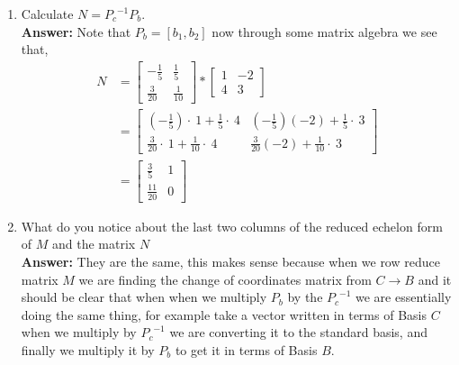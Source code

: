 \documentclass{amsart}
\begin{document}
\begin{enumerate}
\vspace{.1in}

\item Calculate $N = {P_c}^{-1}P_b$.\\
\noindent \textbf{Answer: } Note that $P_b = [b_1,b_2]$ now through some matrix algebra we see that,
\begin{align*}
N &= \begin{bmatrix}-\frac{1}{5}&\frac{1}{5}\\ \frac{3}{20}&\frac{1}{10}\end{bmatrix}
*\begin{bmatrix}
1&-2\\
4&3
\end{bmatrix}\\
&=
\begin{bmatrix}\left(-\frac{1}{5}\right)\cdot \:1+\frac{1}{5}\cdot \:4&\left(-\frac{1}{5}\right)\left(-2\right)+\frac{1}{5}\cdot \:3\\ \frac{3}{20}\cdot \:1+\frac{1}{10}\cdot \:4&\frac{3}{20}\left(-2\right)+\frac{1}{10}\cdot \:3\end{bmatrix}\\
&=
\begin{bmatrix}\frac{3}{5}&1\\ \frac{11}{20}&0\end{bmatrix}
\end{align*}
\vspace{.1in}

\item What do you notice about the last two columns of the reduced echelon form of $M$ and the matrix $N$\\
\noindent \textbf{Answer: }They are the same, this makes sense because when we row reduce matrix $M$ we are finding the change of coordinates matrix from $C\to B$ and it should be clear that when when we multiply $P_b$ by the ${P_c}^{-1}$ we are essentially doing the same thing, for example take a vector written in terms of Basis $C$ when we multiply by ${P_c}^{-1}$ we are converting it to the standard basis, and finally we multiply it by $P_b$ to get it in terms of Basis $B$.
\vspace{.1in}
\end{enumerate}
\end{document}
